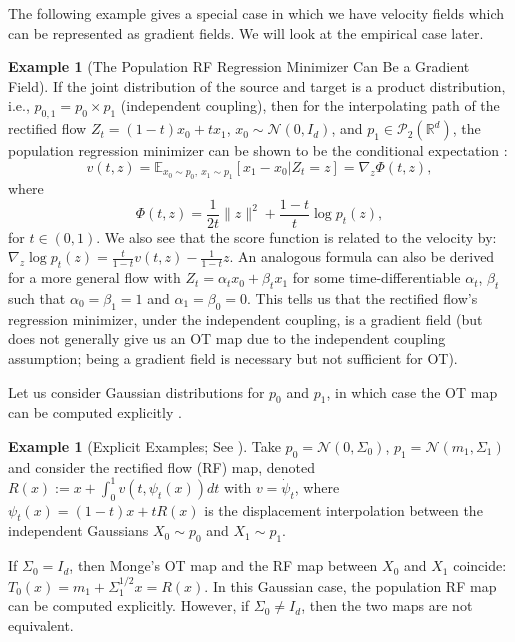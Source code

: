\documentclass[a4paper,11pt]{article}
\newcommand{\R}{\mathbb{R}}
\theoremstyle{plain}
\theoremstyle{definition}
\newtheorem{exampleinner}[theoreminner]{Example}
\newenvironment{example}[1][]
  {\begin{mdframed}[style=examplestyle]\begin{exampleinner}[#1]}
  {\end{exampleinner}\end{mdframed}}
\begin{document}
The following example gives a special case in which we have velocity fields which can be represented as gradient fields. We will look at the empirical case later.

\begin{example}[The Population RF Regression Minimizer Can Be a Gradient Field] \label{ex_gf}
If the joint distribution of the source and target is a product distribution, i.e., $p_{0,1} = p_0 \times p_1$ (independent coupling), then for the interpolating path of the rectified flow $Z_t = (1-t) x_0 + tx_1$, $x_0 \sim \mathcal{N}(0,I_d)$, and $p_1 \in \mathcal{P}_2(\R^d)$, the population regression minimizer can be shown to be the conditional expectation \cite{wald2025flow, zhang2024flow}:
\begin{equation}
    v(t,z) = \mathbb{E}_{x_0 \sim p_0, \ x_1 \sim p_1}[x_1 - x_0 | Z_t = z] =  \nabla_z \Phi(t, z), 
\end{equation}
where 
\begin{equation} \label{eq_Phi}
    \Phi(t,z) = \frac{1}{2t} \|z\|^2 + \frac{1-t}{t} \log p_t(z),
\end{equation}
for $t \in (0,1)$.
We also see that the score function is related to the velocity by: $\nabla_z \log p_t(z) = \frac{t}{1-t} v(t,z) - \frac{1}{1-t} z.$ An analogous formula can also be derived for a more general flow  with $Z_t = \alpha_t x_0 + \beta_t x_1$ for some time-differentiable $\alpha_t$, $\beta_t$ such that $\alpha_0 = \beta_1 = 1$ and $\alpha_1 = \beta_0 = 0$. This tells us that the rectified flow's regression minimizer, under the independent coupling, is a gradient field (but does not generally give us an OT map due to the independent coupling assumption; being a gradient field is necessary but not sufficient for OT).
\end{example}

Let us consider Gaussian distributions for $p_0$ and $p_1$, in which case  the OT map can be computed explicitly \cite{delon2020wasserstein}.

\begin{example}[Explicit Examples; See  \cite{mena2025statistical}] \label{ex_gaussianRF}
Take $p_0 = \mathcal{N}(0, \Sigma_0)$, $p_1 = \mathcal{N}(m_1, \Sigma_1)$ and consider the rectified flow (RF) map, denoted $R(x) := x + \int_0^1 v(t, \psi_t(x)) dt$ with $v = \dot{\psi}_t$, where $\psi_t(x) = (1-t) x + t R(x)$ is the displacement interpolation between the independent Gaussians $X_0 \sim p_0$ and $X_1 \sim p_1$. 

If $\Sigma_0 = I_d$, then  Monge's OT map and the RF map between $X_0$ and $X_1$  coincide: $T_0(x) = m_1 + \Sigma_1^{1/2} x = R(x)$. In this Gaussian case, the population RF map can be computed explicitly. However, if $\Sigma_0 \neq I_d$, then the two maps are not equivalent. 
\end{example}
\end{document}
